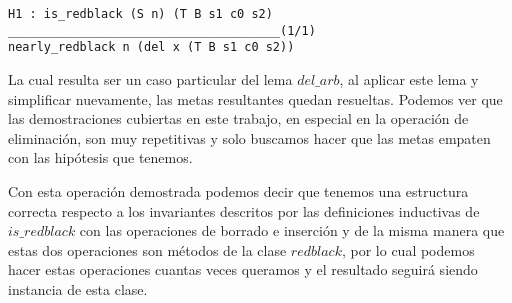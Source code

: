 \begin{verbatim}
H1 : is_redblack (S n) (T B s1 c0 s2)
______________________________________(1/1)
nearly_redblack n (del x (T B s1 c0 s2))
\end{verbatim}

La cual resulta ser un caso particular del lema \hyperref[lema_6]{$del\_arb$}, al aplicar este lema 
y simplificar nuevamente, las metas resultantes quedan resueltas. Podemos ver que las demostraciones 
cubiertas en este trabajo, en especial en la operaci\'on de eliminación, son muy repetitivas y solo 
buscamos hacer que las metas empaten con las hip\'otesis que tenemos.

Con esta operaci\'on demostrada podemos decir que tenemos una estructura correcta respecto
a los invariantes descritos por las definiciones inductivas de 
\hyperref[inductive_isRedB]{$is\_redblack$} con las operaciones de borrado e inserción y de la misma 
manera que estas dos operaciones son métodos de la clase \hyperref[class_rb]{$redblack$}, por lo 
cual podemos hacer estas operaciones cuantas veces queramos y el resultado seguirá siendo instancia 
de esta clase.

